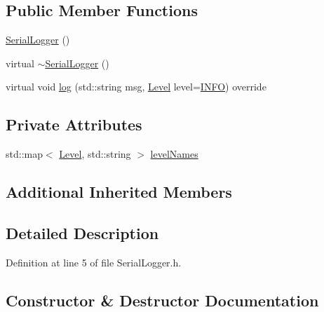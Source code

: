 \subsection*{Public Member Functions}
\begin{DoxyCompactItemize}
\item 
\hyperlink{class_serial_logger_aec37622c02b5cfcc8a453b5bc46b143e}{Serial\+Logger} ()
\item 
virtual \hyperlink{class_serial_logger_aa9b4379968cdea3a5aa767d7e17d4df8}{$\sim$\+Serial\+Logger} ()
\item 
virtual void \hyperlink{class_serial_logger_acb71040c5d7d693cecfd08c1013449dc}{log} (std\+::string msg, \hyperlink{class_i_logger_af129a40b0950160d0fe6c6b675d9d761}{Level} level=\hyperlink{class_i_logger_af129a40b0950160d0fe6c6b675d9d761a1de9525e76b4d18631d4371fb0e4697c}{I\+N\+FO}) override
\end{DoxyCompactItemize}
\subsection*{Private Attributes}
\begin{DoxyCompactItemize}
\item 
std\+::map$<$ \hyperlink{class_i_logger_af129a40b0950160d0fe6c6b675d9d761}{Level}, std\+::string $>$ \hyperlink{class_serial_logger_a77aa170b33c8f7ae9726cc2b1275e7cb}{level\+Names}
\end{DoxyCompactItemize}
\subsection*{Additional Inherited Members}


\subsection{Detailed Description}


Definition at line 5 of file Serial\+Logger.\+h.



\subsection{Constructor \& Destructor Documentation}
\mbox{\label{class_serial_logger_aec37622c02b5cfcc8a453b5bc46b143e}} 
